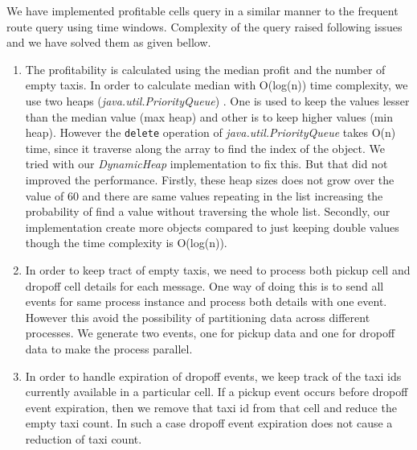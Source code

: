 We have implemented profitable cells query in a similar manner to the frequent route query using  time windows. Complexity of the query raised following issues and we have solved them as given bellow.
\begin{enumerate}
	\item The profitability is calculated using the median profit and the number of empty taxis. In order to calculate median with O(log(n)) time complexity, we use two heaps (\textit{java.util.PriorityQueue}) . One is used to keep the values lesser than the median value (max heap) and other is to keep higher values (min heap). However the \texttt{delete} operation of \textit{java.util.PriorityQueue} takes O(n) time, since it traverse along the array to find the index of the object. We tried with our \textit{DynamicHeap} implementation to fix this. But that did not improved the performance. Firstly, these heap sizes does not grow over the value of 60 and there are same values repeating in the list increasing the probability of find a value without traversing the whole list. Secondly, our implementation create more objects compared to just keeping double values though the time complexity is O(log(n)). 
	\item In order to keep tract of empty taxis, we need to process both pickup cell and dropoff cell details for each message. One way of doing this is to send all events for same process instance and process both details with one event. However this avoid the possibility of partitioning data across different processes. We generate two events, one for pickup data and one for dropoff data to make the process parallel. 
	\item In order to handle expiration of dropoff events, we keep track of the taxi ids currently available in a particular cell. If a pickup event occurs before dropoff event expiration, then we remove that taxi id from that cell and reduce the empty taxi count. In such a case dropoff event expiration does not cause a reduction of taxi count.
\end{enumerate}






